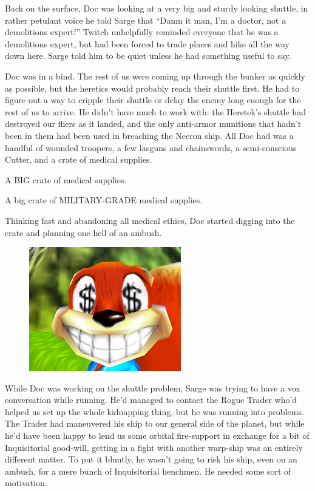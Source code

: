 Back on the surface, Doc was looking at a very big and sturdy looking shuttle, in rather petulant voice he told Sarge that “Damn it man, I’m a doctor, not a demolitions expert!” Twitch unhelpfully reminded everyone that he was a demolitions expert, but had been forced to trade places and hike all the way down here. 
Sarge told him to be quiet unless he had something useful to say.
 
Doc was in a bind. 
The rest of us were coming up through the bunker as quickly as possible, but the heretics would probably reach their shuttle first. 
He had to figure out a way to cripple their shuttle or delay the enemy long enough for the rest of us to arrive. 
He didn’t have much to work with: 
the Heretek’s shuttle had destroyed our fliers as it landed, and the only anti-armor munitions that hadn’t been in them had been used in breaching the Necron ship. 
All Doc had was a handful of wounded troopers, a few lasguns and chainswords, a semi-conscious Cutter, and a crate of medical supplies. 


A BIG crate of medical supplies. 


A big crate of MILITARY-GRADE medical supplies.
 
Thinking fast and abandoning all medical ethics, Doc started digging into the crate and planning one hell of an ambush.

\begin{figure}
	\begin{center}
		\includegraphics[width=\figwidth]{pics/8/55.png}
	\end{center}
\end{figure}
While Doc was working on the shuttle problem, Sarge was trying to have a vox conversation while running. 
He’d managed to contact the Rogue Trader who’d helped us set up the whole kidnapping thing, but he was running into problems. 
The Trader had maneuvered his ship to our general side of the planet, but while he’d have been happy to lend us some orbital fire-support in exchange for a bit of Inquisitorial good-will, getting in a fight with another warp-ship was an entirely different matter. 
To put it bluntly, he wasn’t going to risk his ship, even on an ambush, for a mere bunch of Inquisitorial henchmen. 
He needed some sort of motivation.

